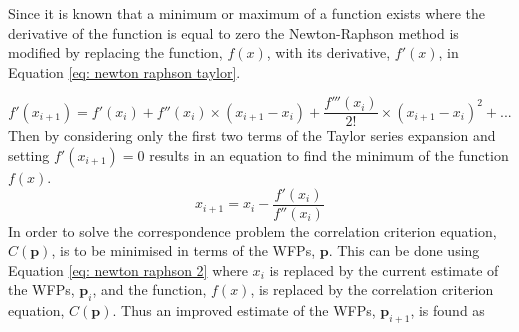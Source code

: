 \documentclass[12pt,oneside,openany,a4paper, %
english, %
masters-t, goldenblock]{usthesis}
\begin{document}
Since it is known that a minimum or maximum of a function exists where the derivative of the function is equal to zero the Newton-Raphson method is modified by replacing the function, $f(x)$, with its derivative, $f'(x)$, in Equation \ref{eq: newton raphson taylor}.

\begin{equation}
  \label{eq: NR one dim}
  f'(x_{i+1})=f'(x_i)+f''(x_i) \times (x_{i+1}-x_i) + \frac{f'''(x_i)}{2!} \times (x_{i+1}-x_i)^2 + ...
\end{equation}
Then by considering only the first two terms of the Taylor series expansion and setting $f'(x_{i+1})=0$ results in an equation to find the minimum of the function $f(x)$.
\begin{equation}
  \label{eq: newton raphson 2}
  x_{i+1}=x_i-\frac{f'(x_i)}{f''(x_i)}
\end{equation}
In order to solve the correspondence problem the correlation criterion equation, $C(\bm{p})$, is to be minimised in terms of the WFPs, $\bm{p}$. This can be done using Equation \ref{eq: newton raphson 2} where $x_i$ is replaced by the current estimate of the WFPs, $\bm{p}_i$, and the function, $f(x)$, is replaced by the correlation criterion equation, $C(\bm{p})$. Thus an improved estimate of the WFPs, $\bm{p}_{i+1}$, is found as
\end{document}
